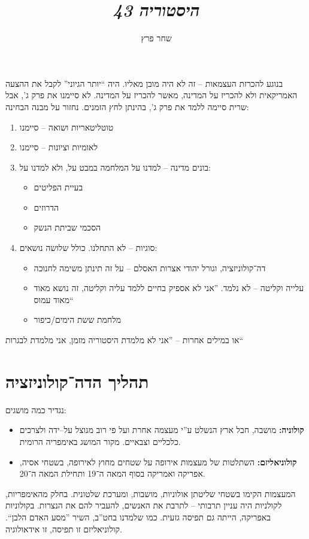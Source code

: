 \documentclass[]{../../../../tex/classes/styledArticle}
\author{שחר פרץ}
\title{\textit{היסטוריה 43}}
\begin{document}
	\maketitle
	בנוגע להכרזת העצמאות – זה לא היה מובן מאליו. היה ``יותר הגיוני'' לקבל את ההצעה האמריקאית ולא להכריז על המדינה, מאשר להכריז על המדינה. 
	לא סיימנו את פרק ג', אבל שרית סיימה ללמד את פרק ג', בהינתן לחץ הזמנים. נחזור על מבנה הבחינה: 
	\begin{enumerate}[A']
		\item טוטליטאריות ושואה – סיימנו
		\item לאומיות וציונות – סיימנו
		\item בונים מדינה – למדנו על המלחמה במבט על, ולא למדנו על: 
		\begin{itemize}
			\item בעיית הפליטים
			\item הדרוזים
			\item הסכמי שביתת הנשק
		\end{itemize}
		\item סוגיות – לא התחלנו. כולל שלושה נושאים: 
		\begin{itemize}
			\item דה‏־קולוניזציה, וגורל יהודי אצרות האסלם – על זה תינתן משימה לחנוכה
			\item עלייה וקליטה – לא נלמד. ''אני לא אספיק בחיים ללמד עליה וקליטה, זה נושא מאוד מאוד עמוס``
			\item מלחמת ששת הימים/כיפור
		\end{itemize}
	\end{enumerate}
	או במילים אחרות – ''אני לא מלמדת היסטוריה מזמן, אני מלמדת לבגרות``
	
	\section*{תהליך הדה־קולוניזציה}
	נגדיר כמה מושגים: 
	\begin{itemize}
		\item \textbf{קולוניה: }מושבה, חבל ארץ הנשלט ע''י מעצמה אחרת ועל פי רוב מנוצל על–ידה ולצרכים כלכליים וצבאיים. מקור המושג באימפריה הרומית. 
		\item \textbf{קולוניאליזם: }השתלטות של מעצמות אירופה על שטחים מחוץ לאירופה, בשטחי אסיה, אפריקה ואמריקה בסוף המאה ה־19 ותחילת המאה ה־20. 
	\end{itemize}
	המעצמות הקימו בשטחי שליטתן אולוניות, מושבות, ומערכת שלטונית. בחלק מהאימפריות, לקולניות היה עניין תרבותי – לתרבת את האנשים, להעביר להם את הנצרות. בקולוניות באפריקה, הייתה גם תפיסה גזעית. כמו שלמדנו בחט''ב, השיר ''מסע האדם הלבן``. קולוניאליזם זו תפיסה, זו אידאולוגיה. 
	
\end{document}
